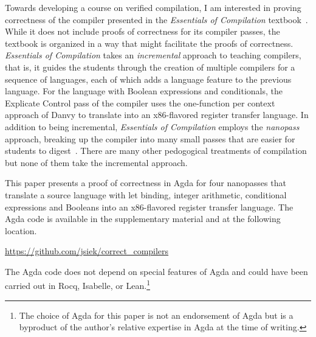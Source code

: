 \documentclass[sigplan,review,dvipsnames,screen,10pt]{acmart}
\begin{document}
Towards developing a course on verified compilation, I am interested
in proving correctness of the compiler presented in the
\emph{Essentials of Compilation}
textbook~\citep{Siek:2023tr,Siek:2023ue}. While it does not include
proofs of correctness for its compiler passes, the textbook is
organized in a way that might facilitate the proofs of correctness.
%
\emph{Essentials of Compilation} takes an \emph{incremental} approach
to teaching compilers, that is, it guides the students through the
creation of multiple compilers for a sequence of languages, each of
which adds a language feature to the previous language. For the
language with Boolean expressions and conditionals, the Explicate
Control pass of the compiler uses the one-function per context
approach of Danvy to translate into an x86-flavored register transfer
language.
%
In addition to being incremental, \emph{Essentials of Compilation}
employs the \emph{nanopass} approach, breaking up the compiler into
many small passes that are easier for students to
digest~\citep{Sarkar:2004fk}.
%
There are many other pedogogical treatments of
compilation~\citep{Appel:2003fk,Sumii:2005aa,Aho:2006wb,Cooper:2011aa,Grune:2012aa}
but none of them take the incremental approach.

This paper presents a proof of correctness in Agda for four nanopasses
that translate a source language with let binding, integer arithmetic,
conditional expressions and Booleans into an x86-flavored register
transfer language. The Agda code is available in the supplementary
material and at the following location.
\begin{center}
\url{https://github.com/jsiek/correct_compilers}
\end{center}
The Agda code does not depend on special features of Agda and could
have been carried out in Rocq, Isabelle, or Lean.\footnote{The choice
of Agda for this paper is not an endorsement of Agda but is a
byproduct of the author's relative expertise in Agda at the time of
writing.}
\end{document}
